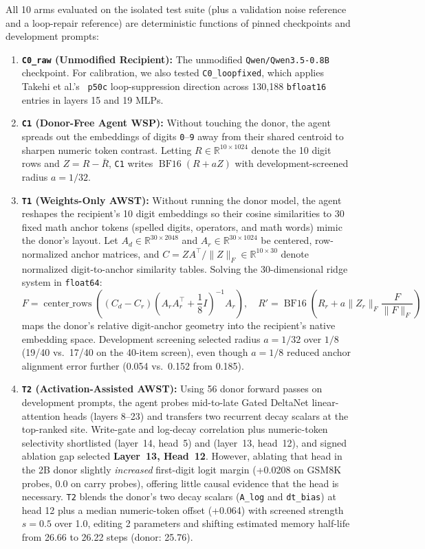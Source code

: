 \documentclass[11pt]{article}
\newcommand{\codepath}[1]{\texttt{\nolinkurl{#1}}}
\begin{document}
All 10 arms evaluated on the isolated test suite (plus a validation noise reference and a loop-repair reference) are deterministic functions of pinned checkpoints and development prompts:

\begin{enumerate}
\item \textbf{\texttt{C0\_raw} (Unmodified Recipient):} The unmodified \codepath{Qwen/Qwen3.5-0.8B} checkpoint. For calibration, we also tested \texttt{C0\_loopfixed}, which applies Takehi et al.'s~\cite{takehi2026sparks} \texttt{p50c} loop-suppression direction across 130,188 \texttt{bfloat16} entries in layers 15 and 19 MLPs.
\item \textbf{\texttt{C1} (Donor-Free Agent WSP):} Without touching the donor, the agent spreads out the embeddings of digits \texttt{0}--\texttt{9} away from their shared centroid to sharpen numeric token contrast. Letting $R \in \mathbb{R}^{10 \times 1024}$ denote the 10 digit rows and $Z = R - \bar{R}$, \texttt{C1} writes $\operatorname{BF16}(R + a Z)$ with development-screened radius $a = 1/32$.
\item \textbf{\texttt{T1} (Weights-Only AWST):} Without running the donor model, the agent reshapes the recipient's 10 digit embeddings so their cosine similarities to 30 fixed math anchor tokens (spelled digits, operators, and math words) mimic the donor's layout. Let $A_d \in \mathbb{R}^{30 \times 2048}$ and $A_r \in \mathbb{R}^{30 \times 1024}$ be centered, row-normalized anchor matrices, and $C = Z A^\top / \|Z\|_F \in \mathbb{R}^{10 \times 30}$ denote normalized digit-to-anchor similarity tables. Solving the 30-dimensional ridge system in \texttt{float64}:
\begin{equation}
F = \operatorname{center\_rows}\!\left((C_d - C_r)\left(A_r A_r^\top + \frac{1}{8} I\right)^{-1} A_r\right), \quad
R' = \operatorname{BF16}\!\left(R_r + a \|Z_r\|_F \frac{F}{\|F\|_F}\right)
\end{equation}
maps the donor's relative digit-anchor geometry into the recipient's native embedding space. Development screening selected radius $a = 1/32$ over $1/8$ (19/40 vs.\ 17/40 on the 40-item screen), even though $a = 1/8$ reduced anchor alignment error further (0.054 vs.\ 0.152 from 0.185).
\item \textbf{\texttt{T2} (Activation-Assisted AWST):} Using 56 donor forward passes on development prompts, the agent probes mid-to-late Gated DeltaNet linear-attention heads (layers 8--23) and transfers two recurrent decay scalars at the top-ranked site. Write-gate and log-decay correlation plus numeric-token selectivity shortlisted (layer~14, head~5) and (layer~13, head~12), and signed ablation gap selected \textbf{Layer~13, Head~12}. However, ablating that head in the 2B donor slightly \emph{increased} first-digit logit margin (+0.0208 on GSM8K probes, 0.0 on carry probes), offering little causal evidence that the head is necessary. \texttt{T2} blends the donor's two decay scalars (\texttt{A\_log} and \texttt{dt\_bias}) at head 12 plus a median numeric-token offset (+0.064) with screened strength $s = 0.5$ over 1.0, editing 2 parameters and shifting estimated memory half-life from 26.66 to 26.22 steps (donor: 25.76).

\end{enumerate}
\end{document}

